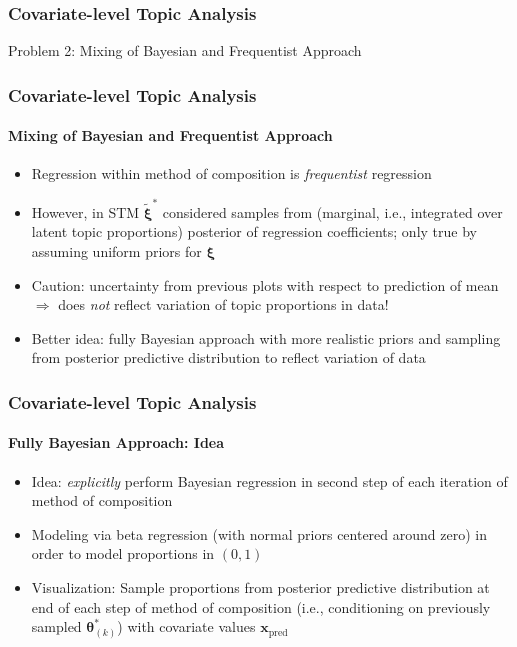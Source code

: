 \documentclass[xcolor=dvipsnames]{beamer}
\begin{document}
\begin{frame}
\frametitle{Covariate-level Topic Analysis}
\begin{center}
Problem 2: Mixing of Bayesian and Frequentist Approach
\end{center}
\end{frame}

\begin{frame}
\frametitle{Covariate-level Topic Analysis}
\framesubtitle{Mixing of Bayesian and Frequentist Approach}
\begin{itemize}
\item Regression within method of composition is \textit{frequentist} regression
\item However, in STM $\tilde{\boldsymbol{\xi}}^*$ considered samples from (marginal, i.e., integrated over latent topic proportions) posterior of regression coefficients; only true by assuming uniform priors for $\boldsymbol{\xi}$
\item Caution: uncertainty from previous plots with respect to prediction of mean $\Rightarrow$ does \textit{not} reflect variation of topic proportions in data!
\item Better idea: fully Bayesian approach with more realistic priors and sampling from posterior predictive distribution to reflect variation of data
\end{itemize}
\end{frame}

\begin{frame}
\frametitle{Covariate-level Topic Analysis}
\framesubtitle{Fully Bayesian Approach: Idea}
\begin{itemize}
\item Idea: \textit{explicitly} perform Bayesian regression in second step of each iteration of method of composition
\item Modeling via beta regression (with normal priors centered around zero) in order to model proportions in $(0,1)$
\item Visualization: Sample proportions from posterior predictive distribution at end of each step of method of composition (i.e., conditioning on previously sampled $\boldsymbol{\theta}_{(k)}^*$) with covariate values $\boldsymbol{x}_{\text{pred}}$
\end{itemize}
\end{frame}
\end{document}
